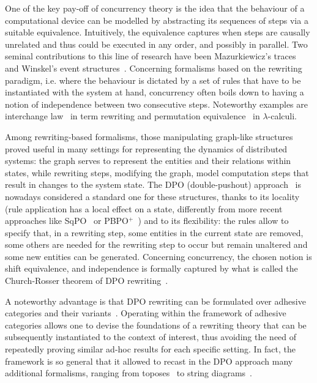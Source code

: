 \documentclass[a4paper,UKenglish,cleveref,pdftex,thm-restate,numberwithinsect,anonymous]{lipics}
\begin{document}
One of the key pay-off of concurrency theory is the idea that the behaviour of 
a computational device can be modelled by abstracting its sequences of steps
via a suitable equivalence. Intuitively, the equivalence 
captures when 
steps are causally unrelated and thus could be executed in any 
order, and possibly in parallel. 
%
Two seminal contributions to this line of research have been
Mazurkiewicz's traces~\cite{Mazurkiewicz86} and Winskel's event structures~\cite{NPW:PNES}.
%
Concerning formalisms based on the rewriting paradigm, i.e. where the
behaviour is dictated by a set of rules that have to be instantiated with
the system at hand, concurrency often boils down to having a notion of 
independence between two consecutive steps.
Noteworthy examples are
interchange law~\cite{Mes92} in term rewriting and permutation 
equivalence~\cite{JJL80} in $\lambda$-calculi. 

Among rewriting-based formalisms, those manipulating graph-like structures
proved useful in many settings for representing the dynamics of distributed systems: the 
graph serves to represent the entities and their relations within states, while 
rewriting steps, modifying the graph, model computation steps that result 
in changes to the system state. The DPO (double-pushout) approach~\cite{EhrigPS73}
is nowadays considered a standard one for these structures, thanks to its locality 
(rule application has a local effect on a state, differently from more recent approaches
like SqPO~\cite{CorradiniHHK06}
or PBPO$^+$~\cite{OverbeekER23}) and to its flexibility: the rules allow to 
specify that,  in a rewriting step, some entities in the current state are removed, 
some others are needed for the rewriting step to occur but remain unaltered and 
some new entities can be generated. Concerning concurrency, the chosen notion 
is shift equivalence, and independence is formally captured by what is called the
Church-Rosser theorem of DPO rewriting~\cite[Section~4]{Ehrig78}.

A noteworthy advantage is that DPO rewriting can be formulated over
adhesive categories and their variants~\cite{lack2005adhesive,ehrig2006weak}. 
%
Operating within the framework of adhesive categories allows one to
devise the foundations of a rewriting theory that can be subsequently
instantiated to the context of interest, thus avoiding the need of
repeatedly proving similar ad-hoc results for each specific
setting. In fact, the framework is so general that it allowed to
recast in the DPO approach many additional formalisms, ranging from
toposes~\cite{johnstone2007quasitoposes} to string
diagrams~\cite{bonchi2022string}.
\end{document}
